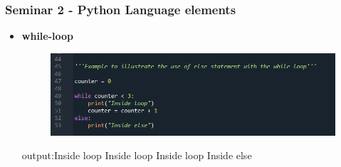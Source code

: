 \documentclass{beamer}
\begin{document}
\begin{frame}[fragile]
\frametitle{Seminar 2 - Python Language elements }
\begin{itemize}
\item \textbf{while-loop}\newline

 \begin{figure} 
   \includegraphics[width=0.8\linewidth]{Seminar_2_images/Python/b py 2.png}
   \end{figure}
   output:\newline Inside loop
Inside loop\newline
Inside loop\newline
Inside else\newline

\end{itemize}
\end{frame}
\end{document}
